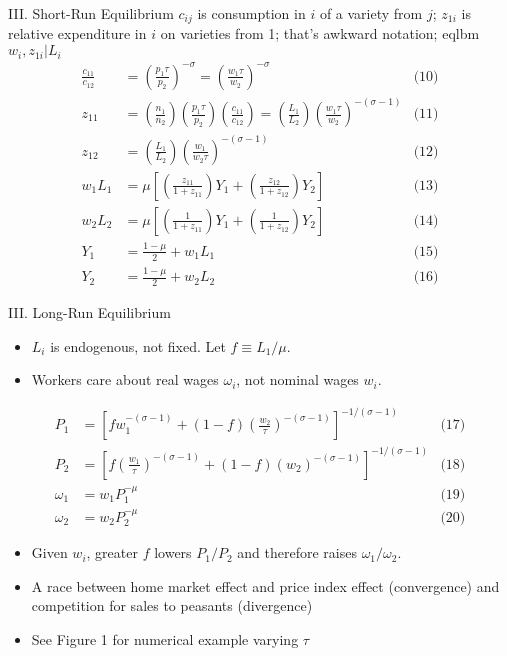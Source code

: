 \documentclass[10pt,notes=hide]{beamer}
\begin{document}
\begin{frame}{III. Short-Run Equilibrium}
$c_{ij}$ is consumption in $i$ of a variety from $j$; 
$z_{1i}$ is relative expenditure in $i$ on varieties from 1;
that's awkward notation;
eqlbm $w_i,z_{1i}\vert L_i$
\begin{align*}
\frac{c_{11}}{c_{12}} 
&= \left(\frac{p_1\tau}{p_2}\right)^{-\sigma} 
= \left(\frac{w_1\tau}{w_2}\right)^{-\sigma}
&
\text{(10)}
\\
z_{11} &= \left(\frac{n_1}{n_2}\right)  \left(\frac{p_1\tau}{p_2}\right) \left(\frac{c_{11}}{c_{12}}\right) 
= \left(\frac{L_1}{L_2}\right) \left(\frac{w_1\tau}{w_2}\right)^{-(\sigma-1)}
&
\text{(11)}
\\
z_{12} 
&=
\left(\frac{L_1}{L_2}\right) \left(\frac{w_1}{w_2\tau}\right)^{-(\sigma-1)}
&
\text{(12)}
\\
w_1 L_1 &= 
\mu \left[\left(\frac{z_{11}}{1+z_{11}}\right) Y_1 + \left(\frac{z_{12}}{1+z_{12}}\right) Y_2   \right]
&
\text{(13)}
\\
w_2 L_2 &= 
\mu \left[\left(\frac{1}{1+z_{11}}\right) Y_1 + \left(\frac{1}{1+z_{12}}\right) Y_2   \right]
&
\text{(14)}
\\
Y_1 &= \frac{1-\mu}{2} + w_1 L_1
&
\text{(15)}
\\
Y_2 &= \frac{1-\mu}{2} + w_2 L_2
&
\text{(16)}
\end{align*}
\end{frame}
\begin{frame}{III. Long-Run Equilibrium}
\begin{itemize}
\item $L_i$ is endogenous, not fixed. Let $f \equiv L_1/\mu$.
\item Workers care about real wages $\omega_i$, not nominal wages $w_i$.
\end{itemize}
\begin{align*}
P_1 &= \left[fw_1^{-(\sigma-1)} + (1-f) \left(\frac{w_2}{\tau}\right)^{-(\sigma-1)} \right]^{-1/(\sigma-1)}
&
\text{(17)}
\\
P_2 &= \left[f\left(\frac{w_1}{\tau}\right)^{-(\sigma-1)} + (1-f) \left(w_2\right)^{-(\sigma-1)} \right]^{-1/(\sigma-1)}
&
\text{(18)}
\\
\omega_1 &= w_1 P_1^{-\mu}
&
\text{(19)}
\\
\omega_2 &= w_2 P_2^{-\mu}
&
\text{(20)}
\end{align*}
\begin{itemize}
	\item Given $w_i$, greater $f$ lowers $P_1/P_2$ and therefore raises $\omega_1/\omega_2$.
	\item A race between home market effect and price index effect (convergence) and competition for sales to peasants (divergence)
	\item See Figure 1 for numerical example varying $\tau$
\end{itemize}
\end{frame}
\end{document}
